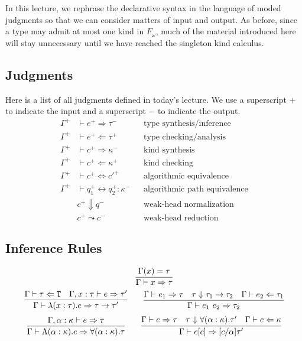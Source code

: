 
In this lecture, we rephrase the declarative syntax in the language of moded
judgments so that we can consider matters of input and output. As before, since
a type may admit at most one kind in $F_\omega$, much of the material introduced
here will stay unnecessary until we have reached the singleton kind calculus.

\subsection{Judgments}

Here is a list of all judgments defined in today's lecture. We use a superscript $+$
to indicate the input and a superscript $-$ to indicate the output.
\begin{align*}
  \Gamma^+ &\vdash e^+ \Rightarrow \tau^- &&\text{type synthesis/inference}\\
  \Gamma^+ &\vdash e^+ \Leftarrow \tau^+ &&\text{type checking/analysis}\\
  \Gamma^+ &\vdash c^+ \Rightarrow \kappa^- &&\text{kind synthesis}\\
  \Gamma^+ &\vdash c^+ \Leftarrow \kappa^+ &&\text{kind checking}\\
  \Gamma^+ &\vdash c^+ \Leftrightarrow c'^+ &&\text{algorithmic equivalence}\\
  \Gamma^+ &\vdash q_1^+ \leftrightarrow q_2^+ : \kappa^- &&\text{algorithmic path equivalence}\\
  &c^+ \Downarrow q^- &&\text{weak-head normalization}\\
  &c^+ \leadsto c^- &&\text{weak-head reduction}
\end{align*}

\subsection{Inference Rules}

\begin{judgment}
\[ \infer{\Gamma \vdash x \Rightarrow \tau}{\Gamma(x) = \tau} \]
\[
  \infer
    {\Gamma \vdash \lambda (x : \tau).e \Rightarrow \tau \rightarrow \tau'}
    {\Gamma \vdash \tau \Leftarrow \T
    &\Gamma,x : \tau \vdash e \Rightarrow \tau'
    }
  \qquad
  \infer
    {\Gamma \vdash e_1~e_2 \Rightarrow \tau_2}
    {\Gamma \vdash e_1 \Rightarrow \tau
    &\tau \Downarrow \tau_1 \rightarrow \tau_2
    &\Gamma \vdash e_2 \Leftarrow \tau_1
    }
\]
\[
  \infer
    {\Gamma \vdash \Lambda (\alpha : \kappa).e \Rightarrow \forall (\alpha : \kappa).\tau}
    {\Gamma, \alpha : \kappa \vdash e \Rightarrow \tau}
  \qquad
  \infer
    {\Gamma \vdash e[c] \Rightarrow [c/\alpha]\tau'}
    {\Gamma \vdash e \Rightarrow \tau
    &\tau \Downarrow \forall (\alpha : \kappa).\tau'
    &\Gamma \vdash c \Leftarrow \kappa
    }
\]
\end{judgment}

